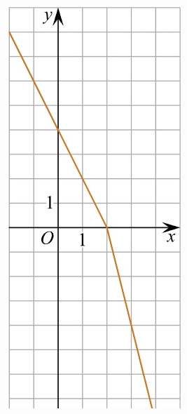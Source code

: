 \begin{class}[number=6]
\begin{listofex}
\begin{minipage}[c]{0.1\textwidth}
			\includegraphics[align=t, width=\textwidth]{pics/G111M4C6-1.jpg}

\end{minipage}
\end{listofex}
\end{class}
